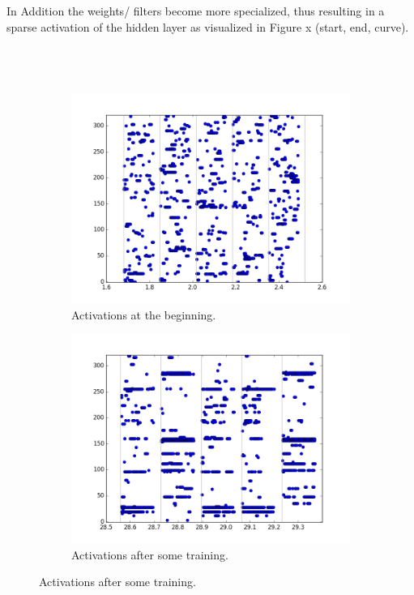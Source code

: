 In Addition the weights/ filters become more specialized, thus resulting in a sparse activation of the hidden layer as visualized in Figure x (start, end, curve).  
\\\\\\\\
\begin{figure}[h!]
	\centering
	\begin{subfigure}[t]{.32\textwidth}
  		\centering
  		\includegraphics[width=.9\linewidth]{imgs/reconst/00030_h.png}
  		\caption{Activations at the beginning.}
  		\label{fig:sub1}
	\end{subfigure}%
	\begin{subfigure}[t]{.32\textwidth}
  		\centering
  		\includegraphics[width=.9\linewidth]{imgs/reconst/00975_h.png}
  		\caption{Activations after some training.}
  		\label{fig:sub2}

\end{subfigure}
\end{figure}
